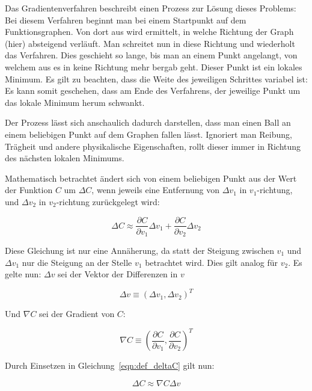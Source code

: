 Das Gradientenverfahren beschreibt einen Prozess zur Lösung dieses Problems: Bei diesem Verfahren beginnt man bei einem Startpunkt auf dem Funktionsgraphen. Von dort aus wird ermittelt, in welche Richtung der Graph (hier) absteigend verläuft. Man schreitet nun in diese Richtung und wiederholt das Verfahren. Dies geschieht so lange, bis man an einem Punkt angelangt, von welchem aus es in keine Richtung mehr bergab geht. Dieser Punkt ist ein lokales Minimum. Es gilt zu beachten, dass die Weite des jeweiligen Schrittes variabel ist: Es kann somit geschehen, dass am Ende des Verfahrens, der jeweilige Punkt um das lokale Minimum herum schwankt.

Der Prozess lässt sich anschaulich dadurch darstellen, dass man einen Ball an einem beliebigen Punkt auf dem Graphen fallen lässt. Ignoriert man Reibung, Trägheit und andere physikalische Eigenschaften, rollt dieser immer in Richtung des nächsten lokalen Minimums.

Mathematisch betrachtet ändert sich von einem beliebigen Punkt aus der Wert der Funktion $C$ um $\Delta C$, wenn jeweils eine Entfernung von $\Delta v_1$ in $v_1$-richtung, und $\Delta v_2$ in $v_2$-richtung zurückgelegt wird: \cite[Kap.~1]{nielsen_15}

\begin{equation}
\label{eqn:def_deltaC}
\Delta C\approx \frac{\partial C}{\partial v_1}\Delta v_1 + \frac{\partial C}{\partial v_2}\Delta v_2
\end{equation}

Diese Gleichung ist nur eine Annäherung, da statt der Steigung zwischen $v_1$ und $\Delta v_1$ nur die Steigung an der Stelle $v_1$ betrachtet wird. Dies gilt analog für $v_2$.
Es gelte nun: $\Delta v$ sei der Vektor der Differenzen in $v$

\begin{equation}
\Delta v\equiv (\Delta v_1, \Delta v_2)^T
\end{equation}

Und $\nabla C$ sei der Gradient von $C$:

\begin{equation}
\nabla C\equiv \left(\frac{\partial C}{\partial v_1}, \frac{\partial C}{\partial v_2}\right)^T
\end{equation}

Durch Einsetzen in Gleichung~\ref{eqn:def_deltaC} gilt nun:

\begin{equation}
\Delta C \approx \nabla C\Delta v
\end{equation}

